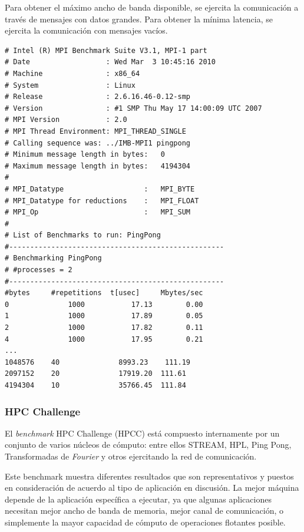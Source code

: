 \documentclass[a4paper]{report}
\begin{document}
\bigskip

Para obtener el máximo ancho de banda disponible, se ejercita la comunicación a través de mensajes con datos grandes. Para obtener la mínima latencia, se ejercita la comunicación con mensajes vacíos.

{\small
\begin{verbatim}
# Intel (R) MPI Benchmark Suite V3.1, MPI-1 part
# Date                  : Wed Mar  3 10:45:16 2010
# Machine               : x86_64
# System                : Linux
# Release               : 2.6.16.46-0.12-smp
# Version               : #1 SMP Thu May 17 14:00:09 UTC 2007
# MPI Version           : 2.0
# MPI Thread Environment: MPI_THREAD_SINGLE
# Calling sequence was: ../IMB-MPI1 pingpong
# Minimum message length in bytes:   0
# Maximum message length in bytes:   4194304
#
# MPI_Datatype                   :   MPI_BYTE
# MPI_Datatype for reductions    :   MPI_FLOAT
# MPI_Op                         :   MPI_SUM
#
# List of Benchmarks to run: PingPong
#---------------------------------------------------
# Benchmarking PingPong
# #processes = 2
#---------------------------------------------------
#bytes     #repetitions  t[usec]     Mbytes/sec
0              1000           17.13        0.00
1              1000           17.89        0.05
2              1000           17.82        0.11
4              1000           17.95        0.21
...
1048576    40              8993.23    111.19
2097152    20              17919.20  111.61
4194304    10              35766.45  111.84
\end{verbatim}
}

\subsubsection{HPC Challenge}

El {\it benchmark} HPC Challenge \cite{hpcc} (HPCC) está compuesto internamente por un conjunto de
varios núcleos de cómputo: entre ellos STREAM, HPL, Ping Pong, Transformadas de {\it Fourier}
y otros ejercitando la red de comunicación.

\bigskip

Este benchmark muestra diferentes resultados que son representativos
y puestos en consideración de acuerdo al tipo de aplicación en discusión.
La mejor máquina depende de la aplicación específica a ejecutar, ya que algunas
aplicaciones necesitan mejor ancho de banda de memoria, mejor canal de comunicación, o
simplemente la mayor capacidad de cómputo de operaciones flotantes posible.
\end{document}
